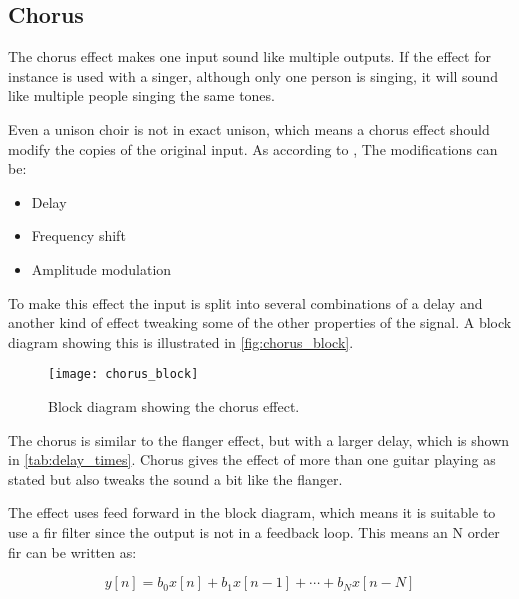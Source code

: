 \subsection{Chorus}
The chorus effect makes one input sound like multiple outputs. If the effect for instance is used with a singer, although only one person is singing, it will sound like multiple people singing the same tones. 

Even a unison choir is not in exact unison, which means a chorus effect should modify the copies of the original input. As according to \cite{chorus_descr}, The modifications can be:

\begin{itemize}
	\item Delay
	\item Frequency shift
	\item Amplitude modulation
\end{itemize}

To make this effect the input is split into several combinations of a delay and another kind of effect tweaking some of the other properties of the signal. A block diagram showing this is illustrated in \autoref{fig:chorus_block}.

\begin{figure}[htbp]
	\centering
	\texttt{[image: chorus\_block]}
	\caption{Block diagram showing the chorus effect.}
	\label{fig:chorus_block}
\end{figure}

The chorus is similar to the flanger effect, but with a larger delay, which is shown in \autoref{tab:delay_times}. Chorus gives the effect of more than one guitar playing as stated but also tweaks the sound a bit like the flanger. 

The effect uses feed forward in the block diagram, which means it is suitable to use a \gls{fir} filter since the output is not in a feedback loop. This means an N order \gls{fir} can be written as:

\begin{equation}
	y[n]=b_0x[n]+b_1x[n-1]+\cdots+b_Nx[n-N]
\end{equation}

\startexplain
\stopexplain
